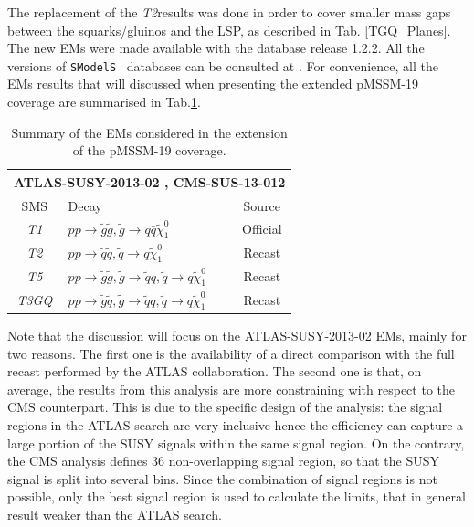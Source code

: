 \documentclass[a4paper,11pt]{article}
\newcommand{\SMO}{\texttt{SModelS\xspace}}
\newcommand{\TGQ}{ \textit{T3GQ}}
\newcommand{\Ttwo}{ \textit{T2}}
\newcommand{\Tfive}{ \textit{T5}}
\begin{document}
The replacement of the \Ttwo results was done in order to cover smaller mass gaps between the squarks/gluinos and the LSP, as described in Tab. \ref{TGQ_Planes}. The new EMs were made available with the database release 1.2.2. All the versions of \SMO~ databases can be consulted at \cite{databases}. For convenience, all the EMs results that will discussed when presenting the extended pMSSM-19 coverage are summarised in Tab.\ref{EMS}.


% 
\begin{table}
	\begin{center}
		\small
		\renewcommand{\arraystretch}{0.9}
		\begin{tabular}{ c l c}  \toprule  \toprule 
			\multicolumn{3}{c}{ATLAS-SUSY-2013-02 , CMS-SUS-13-012} \\ \toprule 
			SMS & Decay & Source \\ \toprule
			\textit{T1} &  $ p p \rightarrow \tilde g \tilde g, \tilde g \rightarrow q \bar q \tilde \chi_1 ^0 $ & Official \\
			\Ttwo & $  p p \rightarrow \tilde q \tilde q , \tilde q \rightarrow q \tilde \chi_1 ^0 $&  Recast\\
			\Tfive & $p p \rightarrow \tilde g \tilde g , \tilde g \rightarrow \tilde q q,  \tilde q \rightarrow q \tilde \chi_1 ^0 $& Recast  \\
			\TGQ & $ p p \rightarrow \tilde g \tilde q, \tilde g \rightarrow \tilde q q,  \tilde q \rightarrow q \tilde \chi_1 ^0 $ & Recast \\  
			\bottomrule \bottomrule                                             
		\end{tabular}
	\end{center}
	\caption{Summary of the EMs considered in the extension of the pMSSM-19 coverage.}
	\label{EMS}
\end{table}
\normalsize
Note that the discussion will focus on the ATLAS-SUSY-2013-02 EMs, mainly for two reasons. The first one is the availability of a direct comparison with the full recast performed by the ATLAS collaboration. The second one is that, on average, the results from this analysis are more constraining with respect to the CMS counterpart. This is due to the specific design of the analysis: the signal regions in the ATLAS search are very inclusive hence the efficiency can capture a large portion of the SUSY signals within the same signal region. On the contrary, the CMS analysis defines 36 non-overlapping signal region, so that the SUSY signal is split into several bins. Since the combination of signal regions is not possible, only the best signal region is used to calculate the limits, that in general result weaker than the ATLAS search.
%
\end{document}
